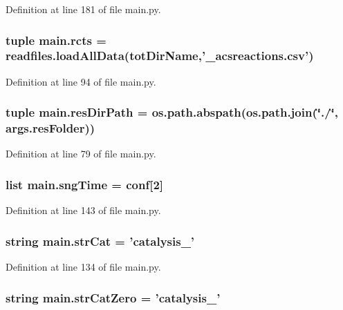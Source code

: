 Definition at line 181 of file main.\-py.

\hypertarget{a00111_ac2fe1ed3228b8e616f25ccfbe4cc7dc4}{
\subsubsection[{rcts}]{\setlength{\rightskip}{0pt plus 5cm}tuple main.\-rcts = readfiles.\-load\-All\-Data({\bf tot\-Dir\-Name},'\-\_\-acsreactions.\-csv')}}\label{a00111_ac2fe1ed3228b8e616f25ccfbe4cc7dc4}


Definition at line 94 of file main.\-py.

\hypertarget{a00111_a93d7d68ada532b3cedaab103283ab91a}{
\subsubsection[{res\-Dir\-Path}]{\setlength{\rightskip}{0pt plus 5cm}tuple main.\-res\-Dir\-Path = os.\-path.\-abspath(os.\-path.\-join(\char`\"{}./\char`\"{}, args.\-res\-Folder))}}\label{a00111_a93d7d68ada532b3cedaab103283ab91a}


Definition at line 79 of file main.\-py.

\hypertarget{a00111_ab4296f1ae2e4c4bb597ca27e84849510}{
\subsubsection[{sng\-Time}]{\setlength{\rightskip}{0pt plus 5cm}list main.\-sng\-Time = {\bf conf}\mbox{[}2\mbox{]}}}\label{a00111_ab4296f1ae2e4c4bb597ca27e84849510}


Definition at line 143 of file main.\-py.

\hypertarget{a00111_ab12df661b7defb4d7077777ad7d6352d}{
\subsubsection[{str\-Cat}]{\setlength{\rightskip}{0pt plus 5cm}string main.\-str\-Cat = 'catalysis\-\_\-'}}\label{a00111_ab12df661b7defb4d7077777ad7d6352d}


Definition at line 134 of file main.\-py.

\hypertarget{a00111_a6bb1e2c0e0d0a9e63313c082ee4eec76}{
\subsubsection[{str\-Cat\-Zero}]{\setlength{\rightskip}{0pt plus 5cm}string main.\-str\-Cat\-Zero = 'catalysis\-\_\-'}}\label{a00111_a6bb1e2c0e0d0a9e63313c082ee4eec76}


